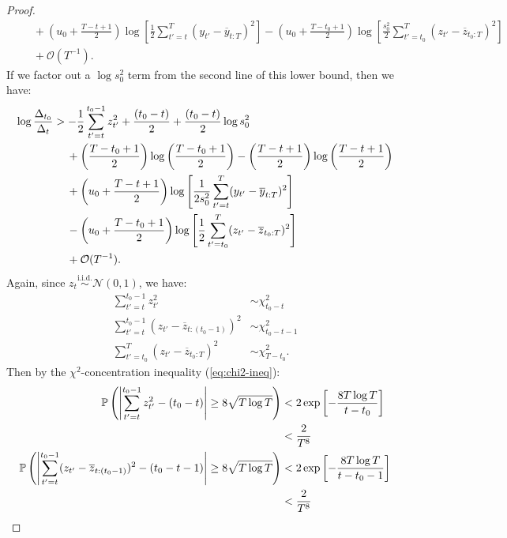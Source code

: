 \documentclass{article}
\begin{document}
\begin{proof}
\begin{align*}
    &\quad\: + \left(u_0 + \frac{T - t +1}{2}\right)\log\left[ \frac{1}{2}\sum_{t'=t}^T (y_{t'} - \overline{y}_{t:T})^2 \right] - \left(u_0 + \frac{T - t_0 +1}{2}\right)\log\left[\frac{s_0^2}{2}\sum_{t'=t_0}^T  (z_{t'} - \overline{z}_{t_0:T})^2 \right] \\
    &\quad\: +  \mathcal{O}(T^{-1}).
\end{align*}
If we factor out a $\log s_0^2$ term from the second line of this lower bound, then we have:
\begin{align}
    \log \frac{\Delta_{t_0}}{\Delta_t} &> - \frac{1}{2} \sum_{t' = t}^{t_0 - 1} z_{t'}^2 + \frac{(t_0-t)}{2} + \frac{(t_0-t)}{2}\log s_0^2 \notag \\
    &\quad\: + \left(\frac{T - t_0 + 1}{2}\right) \log\left(\frac{T-t_0+1}{2}\right) - \left(\frac{T - t + 1}{2}\right) \log\left(\frac{T-t+1}{2}\right) \notag\\
    &\quad\: + \left(u_0 + \frac{T - t +1}{2}\right)\log\left[ \frac{1}{2s_0^2}\sum_{t'=t}^T (y_{t'} - \overline{y}_{t:T})^2 \right] \notag\\
    &\quad\: - \left(u_0 + \frac{T - t_0 +1}{2}\right)\log\left[\frac{1}{2}\sum_{t'=t_0}^T  (z_{t'} - \overline{z}_{t_0:T})^2 \right] \notag\\
    &\quad\: +  \mathcal{O}(T^{-1}). \label{eq:thm3-cs2-bd1}
\end{align}
Again, since $z_{t} \overset{\text{i.i.d.}}{\sim} \mathcal{N}(0,1)$, we have:
\begin{align*}
    \sum_{t'=t}^{t_0-1} z^2_{t'} &\sim \chi^2_{t_0-t} \\
    \sum_{t'=t}^{t_0-1} (z_{t'} - \overline{z}_{t:(t_0-1)})^2 &\sim \chi^2_{t_0-t-1} \\
    \sum_{t'=t_0}^T (z_{t'} - \overline{z}_{t_0:T})^2 &\sim \chi^2_{T-t_0}.
\end{align*}
Then by the $\chi^2$-concentration inequality (\ref{eq:chi2-ineq}):
\begin{align}
    \mathbb{P}\left(\left|\sum_{t'=t}^{t_0-1} z^2_{t'} - (t_0 -t)\right| \geq 8\sqrt{T \log T}\right) &< 2 \exp\left[- 
    \frac{8 T \log T}{t-t_0} \right] \notag \\
    &<  \frac{2}{T^8} \label{eq:thm3-O1-inter} \\
    \mathbb{P}\left(\left|\sum_{t'=t}^{t_0-1} (z_{t'} - \overline{z}_{t:(t_0-1)})^2- (t_0 -t - 1)\right| \geq 8\sqrt{T \log T}\right) &< 2 \exp\left[- 
    \frac{8 T \log T}{t-t_0-1} \right] \notag \\
    &< \frac{2}{T^8} \label{eq:thm3-O2-inter} \\

\end{align}
\end{proof}
\end{document}
